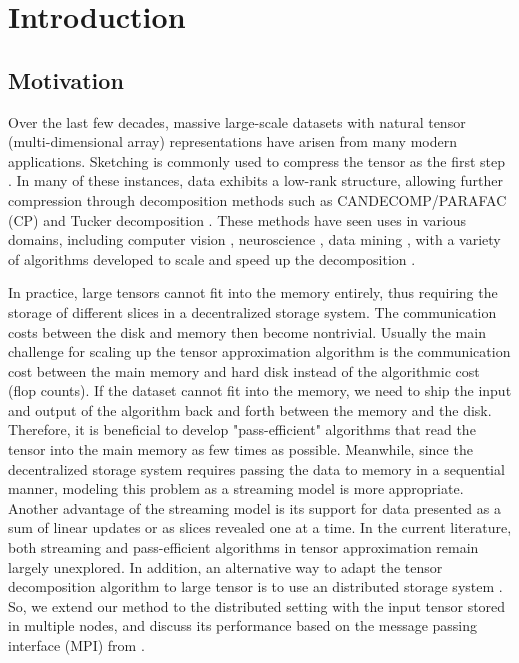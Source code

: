 \section{Introduction}
\subsection{Motivation}

Over the last few decades, massive large-scale datasets with natural tensor (multi-dimensional array) representations have arisen from many modern applications. Sketching is commonly used to compress the tensor as the first step \cite{halko2011finding}. In many of these instances, data exhibits a low-rank structure, allowing further compression through decomposition methods such as CANDECOMP/PARAFAC (CP) and Tucker decomposition \cite{kolda2009tensor}. These methods have seen uses in various domains, including computer vision \cite{vasilescu2002multilinear}, neuroscience \cite{cichocki2013tensor}, data mining \cite{kolda2008scalable}, with a variety of algorithms developed to scale and speed up the decomposition \cite{anandkumar2014tensor,choi2014dfacto,phan2013fast}. 

In practice, large tensors cannot fit into the memory entirely, thus requiring the storage of different slices in a decentralized storage system. The communication costs between the disk and memory then become nontrivial. Usually the main challenge for scaling up the tensor approximation algorithm is the communication cost between the main memory and hard disk instead of the algorithmic cost (flop counts). If the dataset cannot fit into the memory, we need to ship the input and output of the algorithm back and forth between the memory and the disk. Therefore, it is beneficial to develop "pass-efficient" algorithms that read the tensor into the main memory as few times as possible. Meanwhile, since the decentralized storage system requires passing the data to memory in a sequential manner, modeling this problem as a streaming model is more appropriate. Another advantage of the streaming model is its support for data presented as a sum of linear updates or as slices revealed one at a time. In the current literature, both streaming and pass-efficient algorithms in tensor approximation remain largely unexplored. In addition, an alternative way to adapt the tensor decomposition algorithm to large tensor is to use an distributed storage system \citep{austin2016parallel,chakaravarthy2017optimizing, choi2014dfacto}. So, we extend our method to the distributed setting with the input tensor stored in multiple nodes, and discuss its performance based on the message passing interface (MPI) from \citep{austin2016parallel}. 

